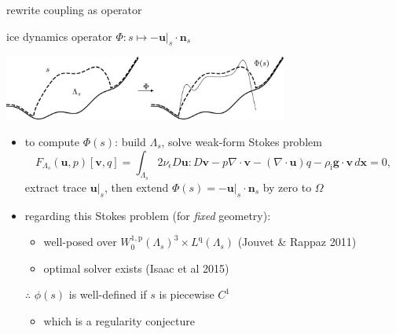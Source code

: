 \documentclass[usepdftitle=false,usenames,dvipsnames]{beamer}
\newcommand{\eps}{\epsilon}
\newcommand{\Div}{\nabla\cdot}
\newcommand{\bg}{\mathbf{g}}
\newcommand{\bn}{\mathbf{n}}
\newcommand{\bu}{\mathbf{u}}
\newcommand{\bv}{\mathbf{v}}
\newcommand{\bx}{\mathbf{x}}
\newcommand{\rhoi}{\rho_{\text{i}}}
\newcommand{\pp}{{\text{p}}}
\newcommand{\qq}{{\text{q}}}
\newcommand{\bus}{\bu|_s}
\begin{document}
\begin{frame}{rewrite coupling as operator}

\begin{block}{ice dynamics operator}
$\Phi : s \mapsto - \bus \cdot \bn_s$

\vspace{-3mm}

\hfill \includegraphics[width=0.7\textwidth]{figs/idoaction.png}
\end{block}

\begin{itemize}
\item to compute $\Phi(s)$: build $\Lambda_s$, solve weak-form Stokes problem
    $$F_{\Lambda_s}(\bu,p)[\bv,q] = \int_{\Lambda_s} 2 \nu_\eps D\bu : D\bv - p \Div\bv - (\Div\bu) q - \rhoi \bg \cdot \bv\,d\bx = 0,$$
extract trace $\bus$, then extend $\Phi(s) = -\bus \cdot \bn_s$ by zero to $\Omega$
\item regarding this Stokes problem (for \emph{fixed} geometry):
    \begin{itemize}
    \item well-posed over $W_0^{1,\pp}(\Lambda_s)^3 \times L^\qq(\Lambda_s)$ (Jouvet \& Rappaz 2011)
    \item optimal solver exists (Isaac et al 2015)
    \end{itemize}
\item[$\therefore$] $\phi(s)$ is well-defined if $s$ is piecewise $C^1$
    \begin{itemize}
    \item which is a regularity conjecture
    \end{itemize}
\end{itemize}

\end{frame}
\end{document}
